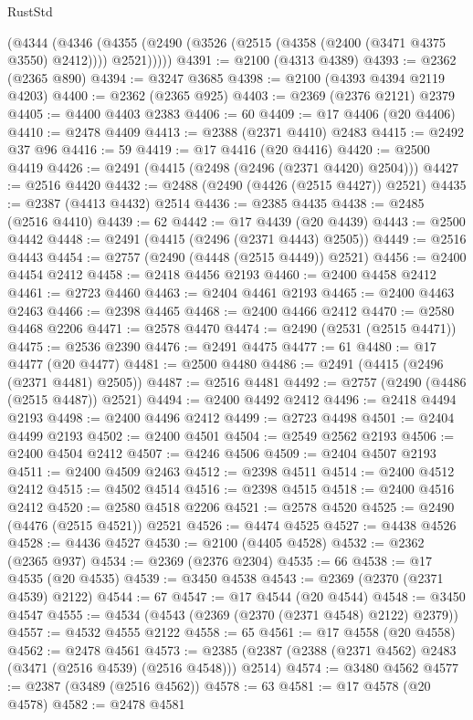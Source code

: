 \begin{lexlean}{RustStd}
\begin{coremodule}
{\begin{coremodule}
{{{{{{{{{{{{{{{{{{{{{{{{{{{{{{{{{{{{{{{{{{{{{{{{{{      (@4344
        (@4346 (@4355 (@2490 (@3526 (@2515 (@4358 (@2400 (@3471 @4375 @3550) @2412)))) @2521)))))
@4391 := @2100 (@4313 @4389)
@4393 := @2362 (@2365 @890)
@4394 := @3247 @3685
@4398 := @2100 (@4393 @4394 @2119 @4203)
@4400 := @2362 (@2365 @925)
@4403 := @2369 (@2376 @2121) @2379
@4405 := @4400 @4403 @2383
@4406 := 60
@4409 := @17 @4406 (@20 @4406)
@4410 := @2478 @4409
@4413 := @2388 (@2371 @4410) @2483
@4415 := @2492 @37 @96
@4416 := 59
@4419 := @17 @4416 (@20 @4416)
@4420 := @2500 @4419
@4426 := @2491 (@4415 (@2498 (@2496 (@2371 @4420) @2504)))
@4427 := @2516 @4420
@4432 := @2488 (@2490 (@4426 (@2515 @4427)) @2521)
@4435 := @2387 (@4413 @4432) @2514
@4436 := @2385 @4435
@4438 := @2485 (@2516 @4410)
@4439 := 62
@4442 := @17 @4439 (@20 @4439)
@4443 := @2500 @4442
@4448 := @2491 (@4415 (@2496 (@2371 @4443) @2505))
@4449 := @2516 @4443
@4454 := @2757 (@2490 (@4448 (@2515 @4449)) @2521)
@4456 := @2400 @4454 @2412
@4458 := @2418 @4456 @2193
@4460 := @2400 @4458 @2412
@4461 := @2723 @4460
@4463 := @2404 @4461 @2193
@4465 := @2400 @4463 @2463
@4466 := @2398 @4465
@4468 := @2400 @4466 @2412
@4470 := @2580 @4468 @2206
@4471 := @2578 @4470
@4474 := @2490 (@2531 (@2515 @4471))
@4475 := @2536 @2390
@4476 := @2491 @4475
@4477 := 61
@4480 := @17 @4477 (@20 @4477)
@4481 := @2500 @4480
@4486 := @2491 (@4415 (@2496 (@2371 @4481) @2505))
@4487 := @2516 @4481
@4492 := @2757 (@2490 (@4486 (@2515 @4487)) @2521)
@4494 := @2400 @4492 @2412
@4496 := @2418 @4494 @2193
@4498 := @2400 @4496 @2412
@4499 := @2723 @4498
@4501 := @2404 @4499 @2193
@4502 := @2400 @4501
@4504 := @2549 @2562 @2193
@4506 := @2400 @4504 @2412
@4507 := @4246 @4506
@4509 := @2404 @4507 @2193
@4511 := @2400 @4509 @2463
@4512 := @2398 @4511
@4514 := @2400 @4512 @2412
@4515 := @4502 @4514
@4516 := @2398 @4515
@4518 := @2400 @4516 @2412
@4520 := @2580 @4518 @2206
@4521 := @2578 @4520
@4525 := @2490 (@4476 (@2515 @4521)) @2521
@4526 := @4474 @4525
@4527 := @4438 @4526
@4528 := @4436 @4527
@4530 := @2100 (@4405 @4528)
@4532 := @2362 (@2365 @937)
@4534 := @2369 (@2376 @2304)
@4535 := 66
@4538 := @17 @4535 (@20 @4535)
@4539 := @3450 @4538
@4543 := @2369 (@2370 (@2371 @4539) @2122)
@4544 := 67
@4547 := @17 @4544 (@20 @4544)
@4548 := @3450 @4547
@4555 := @4534 (@4543 (@2369 (@2370 (@2371 @4548) @2122) @2379))
@4557 := @4532 @4555 @2122
@4558 := 65
@4561 := @17 @4558 (@20 @4558)
@4562 := @2478 @4561
@4573 := @2385 (@2387 (@2388 (@2371 @4562) @2483 (@3471 (@2516 @4539) (@2516 @4548))) @2514)
@4574 := @3480 @4562
@4577 := @2387 (@3489 (@2516 @4562))
@4578 := 63
@4581 := @17 @4578 (@20 @4578)
@4582 := @2478 @4581
}}}}}}}}}}}}}}}}}}}}}}}}}}}}}}}}}}}}}}}}}}}}}}}}}}
\end{coremodule}}
\end{coremodule}
\end{lexlean}
